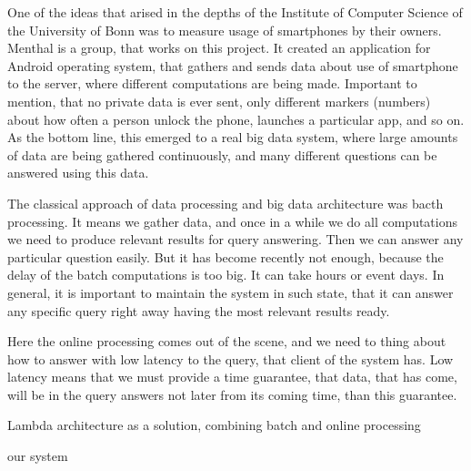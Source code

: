 One of the ideas that arised in the depths of the Institute of Computer Science of the University of Bonn was to measure usage of smartphones by their owners.
Menthal is a group, that works on this project.
It created an application for Android operating system, that gathers and sends data about use of smartphone to the server, where different computations are being made.
Important to mention, that no private data is ever sent, only different markers (numbers) about how often a person unlock the phone, launches a particular app, and so on.
As the bottom line, this emerged to a real big data system, where large amounts of data are being gathered continuously, and many different questions can be answered using this data.

The classical approach of data processing and big data architecture was bacth processing.
It means we gather data, and once in a while we do all computations we need to produce relevant results for query answering.
Then we can answer any particular question easily.
But it has become recently not enough, because the delay of the batch computations is too big.
It can take hours or event days.
In general, it is important to maintain the system in such state, that it can answer any specific query right away having the most relevant results ready.

Here the online processing comes out of the scene, and we need to thing about how to answer with low latency to the query, that client of the system has.
Low latency means that we must provide a time guarantee, that data, that has come, will be in the query answers not later from its coming time, than this guarantee.


Lambda architecture as a solution, combining batch and online processing

our system